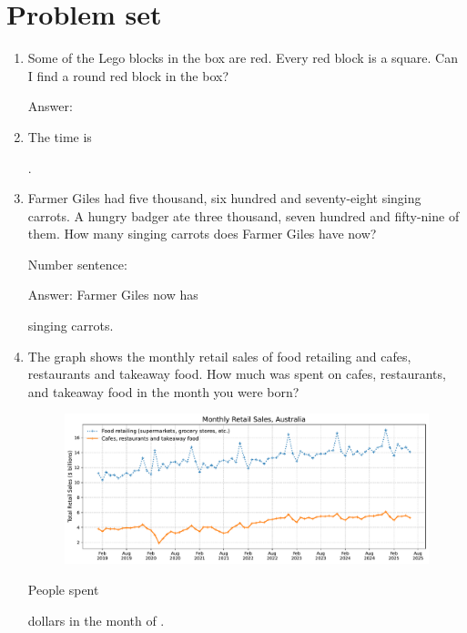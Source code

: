 \documentclass{tufte-book}
\begin{document}
\clearpage\section{Problem set }

\begin{enumerate}

\item Some of the Lego blocks in the box are red. Every red block is a square. Can I find a round red block in the box?\medskip\par
Answer: \dotfill\medskip

\item {}
The time is \dotfill\medskip\par\dotfill\medskip.

\item Farmer Giles had five thousand, six hundred and seventy-eight singing carrots. A hungry badger ate three thousand, seven hundred and fifty-nine of them. How many singing carrots does Farmer Giles have now?\medskip\par
Number sentence: \dotfill\medskip\par
Answer: Farmer Giles now has 
\dotfill\medskip\par\mbox{}\dotfill\medskip\par\mbox{}\dotfill\bigskip
 singing carrots.

\item The graph shows the monthly retail sales of food retailing and cafes, restaurants and takeaway food.
How much was spent on cafes, restaurants, and takeaway food in the month you were born?\par
\begin{figure}[h]\includegraphics[width=1.3\textwidth]{fig/line_retail_sales_food.pdf}\end{figure}
People spent \dotfill\bigskip \par dollars in
the month of \dotfill\bigskip.

\end{enumerate}
\end{document}
